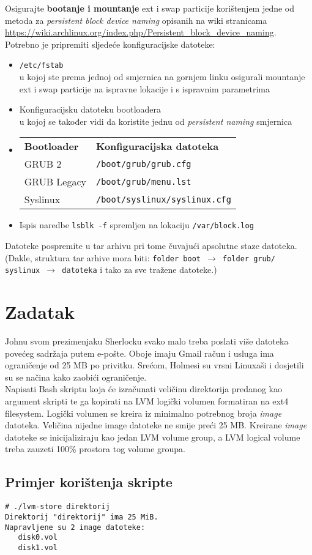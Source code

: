 \documentclass[12pt,a4paper]{article}
\begin{document}
    \noindent Osigurajte \textbf{bootanje i mountanje} ext i swap particije korištenjem jedne od metoda za \emph{persistent block device naming} opisanih na wiki stranicama \url{https://wiki.archlinux.org/index.php/Persistent_block_device_naming}.\\
    \noindent Potrebno je pripremiti sljedeće konfiguracijske datoteke:
    \begin{itemize}
        \item \texttt{/etc/fstab}\\
            u kojoj ste prema jednoj od smjernica na gornjem linku osigurali mountanje ext i swap particije na ispravne lokacije i s ispravnim parametrima
        \item Konfiguracijsku datoteku bootloadera\\
            u kojoj se također vidi da koristite jednu od \emph{persistent naming} smjernica
        \item[] \begin{tabular}{p{4cm} p{6cm}}
                    \textbf{Bootloader} & \textbf{Konfiguracijska datoteka} \\
                    GRUB 2 & \texttt{/boot/grub/grub.cfg}\\
                    GRUB Legacy & \texttt{/boot/grub/menu.lst}\\
                    Syslinux & \texttt{/boot/syslinux/syslinux.cfg}
                \end{tabular}
        \item Ispis naredbe \texttt{lsblk -f} spremljen na lokaciju \texttt{/var/block.log}
    \end{itemize}
    Datoteke pospremite u tar arhivu pri tome čuvajući apsolutne staze datoteka. (Dakle, struktura tar arhive mora biti: \texttt{folder boot $\rightarrow$ folder grub/ syslinux $\rightarrow$ datoteka} i tako za sve tražene datoteke.)\\
    
   
	\section{Zadatak}
	Johnu svom prezimenjaku Sherlocku svako malo treba poslati više datoteka povećeg sadržaja putem e-pošte. Oboje imaju Gmail račun i usluga ima ograničenje od 25 MB po privitku. Srećom, Holmesi su vrsni Linuxaši i dosjetili su se načina kako zaobići ograničenje.\\
	
	\noindent Napisati Bash skriptu koja će izračunati veličinu direktorija predanog kao argument skripti te ga kopirati na LVM logički volumen formatiran na ext4 filesystem. Logički volumen se kreira iz minimalno potrebnog broja \textit{image} datoteka. Veličina nijedne image datoteke ne smije preći 25 MB. Kreirane \textit{image} datoteke se inicijaliziraju kao jedan LVM volume group, a LVM logical volume treba zauzeti 100\% prostora tog volume groupa.
	
	\subsection*{Primjer korištenja skripte}
	\begin{verbatim}
# ./lvm-store direktorij
Direktorij "direktorij" ima 25 MiB.
Napravljene su 2 image datoteke:
   disk0.vol
   disk1.vol
	\end{verbatim}	
\end{document}
